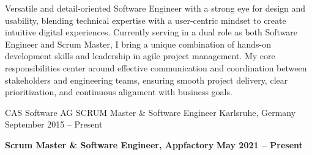 \documentclass[10pt, a4paper]{cvhari}
\begin{document}

\makecvheader
\medskip



    \par
    Versatile and detail-oriented Software Engineer with a strong eye for design and usability, blending technical expertise with a user-centric mindset to create intuitive digital experiences. Currently serving in a dual role as both Software Engineer and Scrum Master, I bring a unique combination of hands-on development skills and leadership in agile project management. My core responsibilities center around effective communication and coordination between stakeholders and engineering teams, ensuring smooth project delivery, clear prioritization, and continuous alignment with business goals.
    \par
\medskip



    \company
        {CAS Software AG}
        {SCRUM Master \& Software Engineer}
        {Karlsruhe, Germany}
        {September 2015 -- Present}
    \vspace{0.5em}

    \textbf{Scrum Master \& Software Engineer, Appfactory} \hfill \textbf{May 2021 -- Present}

    \vspace{0.2em}
\end{document}

